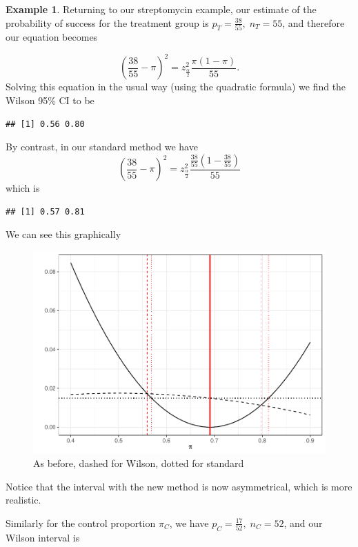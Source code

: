 \documentclass[
  openany]{book}
\theoremstyle{definition}
\theoremstyle{definition}
\newtheorem{example}{Example}[chapter]
\theoremstyle{definition}
\theoremstyle{definition}
\theoremstyle{remark}
\begin{document}
\begin{example}

Returning to our streptomycin example, our estimate of the probability of success for the treatment group is \(p_T = \frac{38}{55},\;n_T = 55\), and therefore our equation becomes

\[\left(\frac{38}{55} - \pi\right)^2 = z^2_{\frac{\alpha}{2}}\frac{\pi\left(1-\pi\right)}{55}.\]
Solving this equation in the usual way (using the quadratic formula) we find the Wilson 95\% CI to be

\begin{verbatim}
## [1] 0.56 0.80
\end{verbatim}

By contrast, in our standard method we have
\[\left(\frac{38}{55} - \pi\right)^2 = z^2_{\frac{\alpha}{2}}\frac{\frac{38}{55}\left(1-\frac{38}{55}\right)}{55}\]
which is

\begin{verbatim}
## [1] 0.57 0.81
\end{verbatim}

We can see this graphically

\begin{figure}
\centering
\includegraphics{CT4H_notes_files/figure-latex/unnamed-chunk-34-1.pdf}
\caption{\label{fig:unnamed-chunk-34}As before, dashed for Wilson, dotted for standard}
\end{figure}

Notice that the interval with the new method is now asymmetrical, which is more realistic.

Similarly for the control proportion \(\pi_C\), we have \(p_C = \frac{17}{52},\; n_C=52\), and our Wilson interval is


\end{example}
\end{document}
